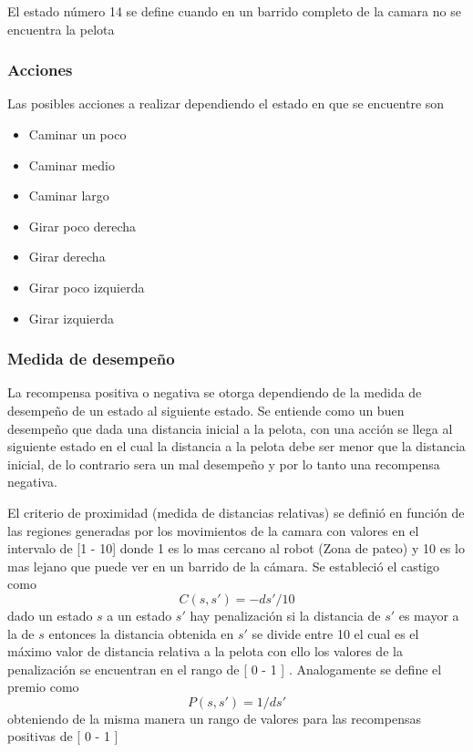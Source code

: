 El estado n\'umero 14 se define cuando en un barrido completo de la camara no se encuentra la pelota

\subsubsection{Acciones}

Las posibles acciones a realizar dependiendo el estado en que se encuentre son 

\begin{itemize}
\item Caminar un poco 
\item Caminar medio
\item Caminar largo
\item Girar poco derecha
\item Girar derecha
\item Girar poco izquierda
\item Girar izquierda
\end{itemize}

\subsubsection{Medida de desempeño}

La recompensa positiva o negativa se otorga dependiendo de la medida de desempeño de un estado al siguiente estado. Se entiende como un buen desempeño que dada una distancia inicial a la pelota, con una acción se llega al siguiente estado en el cual la distancia a la pelota debe ser menor que la distancia inicial, de lo contrario sera un mal desempeño y por lo tanto una recompensa negativa.

El criterio de proximidad (medida de distancias relativas) se definió en función de las regiones generadas por los movimientos de la camara con valores en el intervalo de [1 - 10] donde 1 es lo mas cercano al robot (Zona de pateo) y 10 es lo mas lejano que puede ver en un barrido de la c\'amara. Se estableci\'o el castigo como \[C(s,s') = -ds'/ 10 \] dado un estado  $ s$ a un estado $s'$ hay penalización si la distancia de $s'$ es mayor a la de $s$ entonces la distancia obtenida en $s'$ se divide entre 10 el cual es el máximo valor de distancia relativa a la pelota con ello los valores de la penalización se encuentran en el rango de [ 0 - 1 ] . Analogamente se define el premio como \[P(s,s') = 1 /ds' \] obteniendo de la misma manera un rango de valores para las recompensas positivas de [ 0 - 1 ] 

